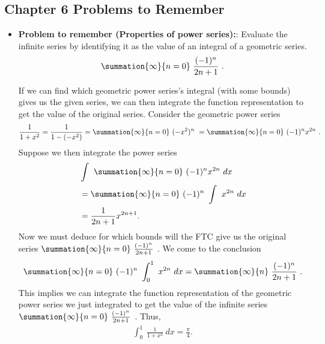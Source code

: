 \documentclass{report}
\begin{document}
\subsection{Chapter 6 Problems to Remember}
\begin{itemize}
    \item \textbf{Problem to remember (Properties of power series):}: Evaluate the infinite series by identifying it as the value of an integral of a geometric series.
        \begin{align*}
            \summation{\infty}{n=0}\ \frac{(-1)^{n}}{2n+1}\ 
        .\end{align*}
        \begin{remark}
            If we can find which geometric power series's integral (with some bounds) gives us the given series, we can then integrate the function representation to get the value of the original series. Consider the geometric power series
            \begin{align*}
                \frac{1}{1+x^{2}} = \frac{1}{1-(-x^{2})} = \summation{\infty}{n=0}\ (-x^{2})^{n}\  = \summation{\infty}{n=0}\ (-1)^{n}x^{2n}\ 
            .\end{align*}
            Suppose we then integrate the power series
            \begin{align*}
                        &\int_{}^{}\ \summation{\infty}{n=0}\ (-1)^{n}x^{2n}\ dx \\
                        &=\summation{\infty}{n=0}\ (-1)^{n}\ \int_{}^{}\ x^{2n}\ dx \\
                        &=\frac{1}{2n+1}x^{2n+1}
                    .\end{align*}
                    Now we must deduce for which bounds will the FTC give us the original series $\summation{\infty}{n=0}\ \frac{(-1)^{n}}{2n+1}\  $. We come to the conclusion
                    \begin{align*}
                        \summation{\infty}{n=0}\ (-1)^{n}\ \int_{0}^{1}\ x^{2n}\ dx = \summation{\infty}{n}\ \frac{(-1)^{n}}{2n+1}\ 
                    .\end{align*}
                    This implies we can integrate the function representation of the geometric power series we just integrated to get the value of the infinite series $\summation{\infty}{n=0}\ \frac{(-1)^{n}}{2n+1}\  $. Thus,
                    \begin{align*}
                        \int_{0}^{1}\ \frac{1}{1+x^{2}}\ dx = \frac{\pi}{4}
                    .\end{align*}

\end{remark}
\end{itemize}
\end{document}
